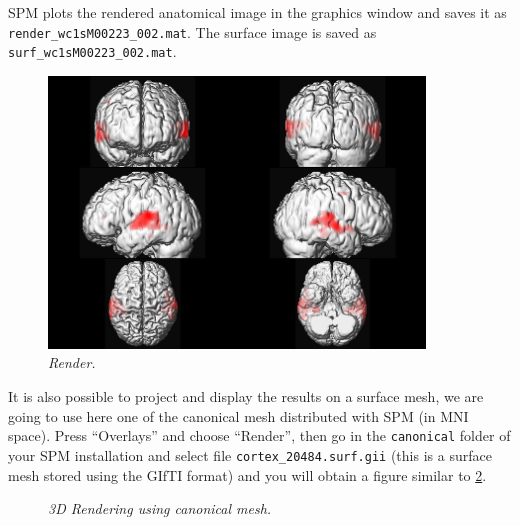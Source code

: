 SPM plots the rendered anatomical image in the graphics window and saves it as \texttt{render\_\-wc1sM00223\_\-002.mat}. The surface image is saved as \texttt{surf\_wc1sM00223\_002.mat}.

\begin{figure}
\begin{center}
\includegraphics[width=100mm]{auditory/render}
\caption{\emph{Render.} \label{aud_render} }
\end{center}
\end{figure}

It is also possible to project and display the results on a surface mesh, we are going to use here one of the canonical mesh distributed with SPM (in MNI space). Press ``Overlays'' and choose ``Render'', then go in the \texttt{canonical} folder of your SPM installation and select file \texttt{cortex\_20484.surf.gii} (this is a surface mesh stored using the GIfTI format) and you will obtain a figure similar to \ref{aud_render2}.

\begin{figure}
\begin{center}
\caption{\emph{3D Rendering using canonical mesh.} \label{aud_render2}}
\end{center}
\end{figure}

%
%

